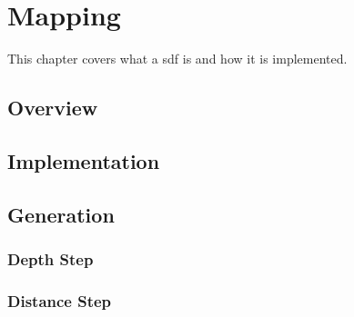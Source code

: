\chapter{Mapping}
This chapter covers what a \ac{sdf} is and how it is implemented.

\section{Overview}


\section{Implementation}

\section{Generation}
    \subsection{Depth Step}
    \subsection{Distance Step}
